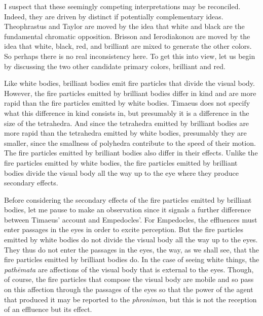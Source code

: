 I suspect that these seemingly competing interpretations may be reconciled. Indeed, they are driven by distinct if potentially complementary ideas. Theophrastus and Taylor are moved by the idea that white and black are the fundamental chromatic opposition. Brisson and Ierodiakonou are moved by the idea that white, black, red, and brilliant are mixed to generate the other colors. So perhaps there is no real inconsistency here. To get this into view, let us begin by discussing the two other candidate primary colors, brilliant and red.

Like white bodies, brilliant bodies emit fire particles that divide the visual body. However, the fire particles emitted by brilliant bodies differ in kind and are more rapid than the fire particles emitted by white bodies. Timaeus does not specify what this difference in kind consists in, but presumably it is a difference in the size of the tetrahedra. And since the tetrahedra emitted by brilliant bodies are more rapid than the tetrahedra emitted by white bodies, presumably they are smaller, since the smallness of polyhedra contribute to the speed of their motion. The fire particles emitted by brilliant bodies also differ in their effects. Unlike the fire particles emitted by white bodies, the fire particles emitted by brilliant bodies divide the visual body all the way up to the eye where they produce secondary effects.

Before considering the secondary effects of the fire particles emitted by brilliant bodies, let me pause to make an observation since it signals a further difference between Timaeus' account and Empedocles'. For Empedocles, the effluences must enter passages in the eyes in order to excite perception. But the fire particles emitted by white bodies do not divide the visual body all the way up to the eyes. They thus do not enter the passages in the eyes, the way, as we shall see, that the fire particles emitted by brilliant bodies do. In the case of seeing white things, the \emph{pathēmata} are affections of the visual body that is external to the eyes. Though, of course, the fire particles that compose the visual body are mobile and so pass on this affection through the passages of the eyes so that the power of the agent that produced it may be reported to the \emph{phronimon}, but this is not the reception of an effluence but its effect. 

